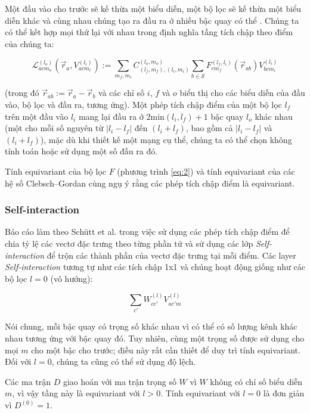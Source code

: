 Một đầu vào cho trước sẽ kế thừa một biểu diễn, một bộ lọc sẽ kế thừa một biểu diễn khác và cùng nhau chúng tạo ra đầu ra ở nhiều bậc quay có thể\cite{thomas2018tensorfieldnetworksrotation} . Chúng ta có thể kết hợp mọi thứ lại với nhau trong định nghĩa tầng tích chập theo điểm của chúng ta:

\begin{equation}\label{eq:3}
\mathcal{L}^{(l_o)}_{acm_o} (\vec{r}_a, V^{(l_i)}_{acm_i})  :=  \sum_{m_f, m_i}  C^{(l_o, m_o)}_{(l_f, m_f),(l_i, m_i)} \sum_{b \in \mathcal{S}} F^{(l_f, l_i)}_{cm_f}(\vec{r}_{ab}) V^{(l_i)}_{bcm_i}
\end{equation}

(trong đó $\vec{r}_{ab} := \vec{r}_a - \vec{r}_b$ và các chỉ số $i$, $f$ và $o$ biểu thị cho các biểu diễn của đầu vào, bộ lọc và đầu ra, tương ứng). Một phép tích chập điểm của một bộ lọc $l_f$ trên một đầu vào $l_i$ mang lại đầu ra ở $2\text{min}(l_i, l_f) + 1$ bậc quay $l_o$ khác nhau (một cho mỗi số nguyên từ $|l_i - l_f|$ đến $(l_i + l_f)$, bao gồm cả $|l_i - l_f|$ và $(l_i + l_f)$), mặc dù khi thiết kế một mạng cụ thể, chúng ta có thể chọn không tính toán hoặc sử dụng một số đầu ra đó\cite{thomas2018tensorfieldnetworksrotation}.

Tính equivariant của bộ lọc $F$ (phương trình \ref{eq:2}) và tính equivariant của các hệ số Clebsch–Gordan cùng ngụ ý rằng các phép tích chập điểm là equivariant.

\subsubsection{Self-interaction}
Báo cáo làm theo Schütt et al. \cite{schütt2017schnetcontinuousfilterconvolutionalneural} trong việc sử dụng các phép tích chập điểm để chia tỷ lệ các vectơ đặc trưng theo từng phần tử và sử dụng các lớp \textit{Self-interaction} để trộn các thành phần của vectơ đặc trưng tại mỗi điểm. Các layer \textit{Self-interaction} tương tự như các tích chập 1x1 và chúng hoạt động giống như các bộ lọc $l = 0$ (vô hướng):

$$
\sum_{c'} W^{(l)}_{cc'} V^{(l)}_{ac'm}
$$

Nói chung, mỗi bậc quay có trọng số khác nhau vì có thể có số lượng kênh khác nhau tương ứng với bậc quay đó. Tuy nhiên, cùng một trọng số được sử dụng cho mọi $m$ cho một bậc cho trước; điều này rất cần thiết để duy trì tính equivariant. Đối với $l = 0$, chúng ta cũng có thể sử dụng độ lệch.

Các ma trận $D$ giao hoán với ma trận trọng số $W$ vì $W$ không có chỉ số biểu diễn $m$, vì vậy tầng này là equivariant với $l > 0$. Tính equivariant với $l = 0$ là đơn giản vì $D^{(0)} = 1$. 


